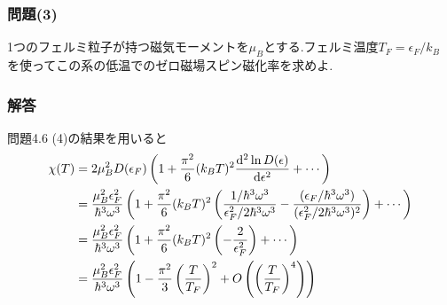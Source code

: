 \subsubsection*{問題(3)}
1つのフェルミ粒子が持つ磁気モーメントを$\mu_B$とする.フェルミ温度$T_F=\epsilon_F/k_B$
を使ってこの系の低温でのゼロ磁場スピン磁化率を求めよ.\\
\hrulefill
\subsubsection*{解答}
問題4.6 (4)の結果を用いると
\begin{align}
  \begin{split}
    \chi(T)&=2\mu_B^2D(\epsilon_F)\left(1+\frac{\pi^2}{6}(k_BT)^2\frac{{\rm d}^2\ln D(\epsilon)}{{\rm d}\epsilon^2}+\cdots\right)\\
    &=\frac{\mu_B^2\epsilon_F^2}{\hbar^3\omega^3}\left(1+\frac{\pi^2}{6}(k_BT)^2\left(\frac{1/\hbar^3\omega^3}{\epsilon_F^2/2\hbar^3\omega^3}-\frac{(\epsilon_F/\hbar^3\omega^3)}{(\epsilon_F^2/2\hbar^3\omega^3)^2}\right)+\cdots\right)\\
    &=\frac{\mu_B^2\epsilon_F^2}{\hbar^3\omega^3}\left(1+\frac{\pi^2}{6}(k_BT)^2\left(-\frac{2}{\epsilon_F^2}\right)+\cdots\right)\\
    &=\frac{\mu_B^2\epsilon_F^2}{\hbar^3\omega^3}\left(1-\frac{\pi^2}{3}\left(\frac{T}{T_F}\right)^2+O\left(\left(\frac{T}{T_F}\right)^4\right)\right)
  \end{split}
\end{align}